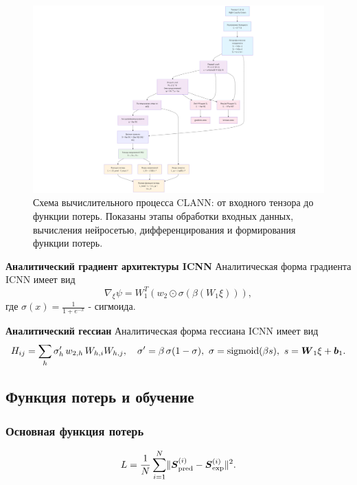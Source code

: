 \begin{figure}[htbp]
\centering
\includegraphics[width=1.3\textwidth]{img/clann_arc.png}
\caption{Схема вычислительного процесса CLANN: от входного тензора до функции потерь. Показаны этапы обработки входных данных, вычисления нейросетью, дифференцирования и формирования функции потерь.}
\label{fig:clann_architecture}
\end{figure}

\textbf{Аналитический градиент архитектуры ICNN}
Аналитическая форма градиента ICNN имеет вид
\begin{equation}
 \nabla_\xi \psi = W_1^T \left( w_2 \odot \sigma(\beta (W_1 \xi)) \right),
\end{equation}
где $\sigma(x) = \frac{1}{1 + e^{-x}}$ - сигмоида.

\textbf{Аналитический гессиан}
Аналитическая форма гессиана ICNN имеет вид
\begin{equation}
 H_{ij} = \sum_h \sigma'_h\,w_{2,h}\,W_{h,i}W_{h,j},\quad \sigma' = \beta\,\sigma(1-\sigma),\ \sigma=\operatorname{sigmoid}(\beta s),\ s=\vect W_1\xi+\vect b_1.
\end{equation}

\subsection{Функция потерь и обучение}
\subsubsection{Основная функция потерь}
\begin{equation}
 L = \frac{1}{N}\sum_{i=1}^N \lVert \boldsymbol{S}^{(i)}_{\text{pred}} - \boldsymbol{S}^{(i)}_{\text{exp}} \rVert^2.
\end{equation}

